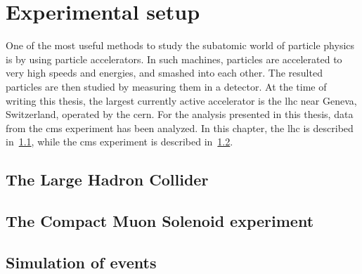 \chapter{Experimental setup}

One of the most useful methods to study the subatomic world of particle physics is by using particle accelerators. In such machines, particles are accelerated to very high speeds and energies, and smashed into each other. The resulted particles are then studied by measuring them in a detector. At the time of writing this thesis, the largest currently active accelerator is the \gls{lhc} near Geneva, Switzerland, operated by the \gls{cern}. For the analysis presented in this thesis, data from the \gls{cms} experiment has been analyzed. In this chapter, the \gls{lhc} is described in~\ref{sec:lhc},  while the \gls{cms} experiment is described in~\ref{sec:cms}.

\section{The Large Hadron Collider}
\label{sec:lhc}

\section{The Compact Muon Solenoid experiment}
\label{sec:cms}



\section{Simulation of events}
